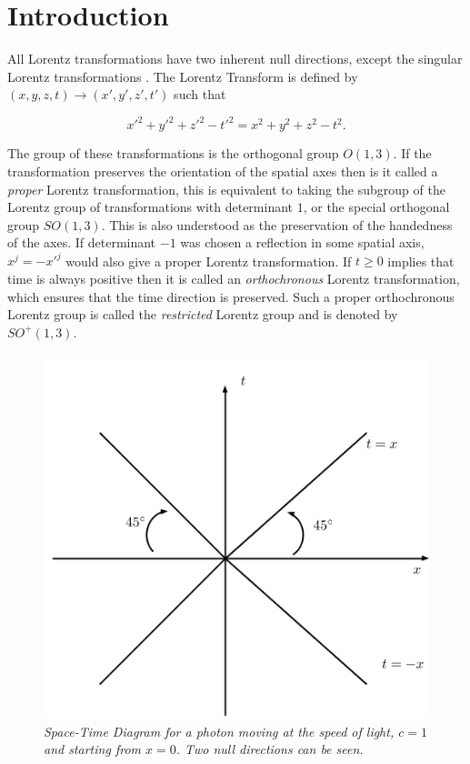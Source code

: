 \section{Introduction}

All Lorentz transformations have two inherent null directions, except the singular Lorentz transformations \cite[p. 85]{Relativity_Synge}. The Lorentz Transform is defined by $(x,y,z,t) \rightarrow (x',y',z',t')$ such that

\begin{equation*}
{x'}^2 + {y'}^2 + {z'}^2 - {t'}^2 = x^2 + y^2 + z^2 - t^2.
\end{equation*}

\noindent The group of these transformations is the orthogonal group $O(1,3)$. If the transformation preserves the orientation of the spatial axes then is it called a \textit{proper} Lorentz transformation, this is equivalent to taking the subgroup of the Lorentz group of transformations with determinant $1$, or the special orthogonal group $SO(1,3)$. This is also understood as the preservation of the handedness of the axes. If determinant $-1$ was chosen a reflection in some spatial axis, $x^j = -{x'}^j$ would also give a proper Lorentz transformation. If $t \geq 0$ implies that time is always positive then it is called an \textit{orthochronous} Lorentz transformation, which ensures that the time direction is preserved. Such a proper orthochronous Lorentz group is called the \textit{restricted} Lorentz group and is denoted by $SO^{+}(1,3)$. 

\begin{figure}[h!]
\begin{center}
\caption{\textit{Space-Time Diagram for a photon moving at the speed of light, $c=1$ and starting from $x = 0$. Two null directions can be seen.}}
\label{figure_Photon_Space_Time}
\includegraphics[scale=0.8]{figs/1_1.jpg}
\end{center}
\end{figure}

